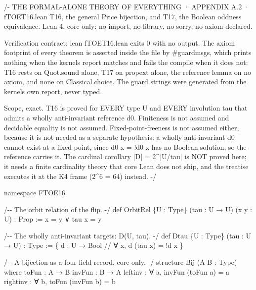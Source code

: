 \documentclass[10pt]{article}
\renewcommand{\_}{\origunderscore\allowbreak}
\newenvironment{Shaded}{}{}
\newcommand{\NormalTok}[1]{#1}
\begin{document}
\begin{Shaded}
\begin{Highlighting}[]
\NormalTok{/{-}}
\NormalTok{THE FORMAL{-}ALONE THEORY OF EVERYTHING · APPENDIX A.2 · fTOE\_T16.lean}
\NormalTok{T16, the general Price bijection, and T17, the Boolean oddness equivalence.}
\NormalTok{Lean 4, core only: no import, no library, no sorry, no axiom declared.}

\NormalTok{Verification contract: \textasciigrave{}lean fTOE\_T16.lean\textasciigrave{} exits 0 with no output. The}
\NormalTok{axiom footprint of every theorem is asserted inside the file by}
\NormalTok{\textasciigrave{}\#guard\_msgs\textasciigrave{}, which prints nothing when the kernel\textquotesingle{}s report matches and}
\NormalTok{fails the compile when it does not: T16 rests on Quot.sound alone, T17 on}
\NormalTok{propext alone, the reference lemma on no axiom, and none on}
\NormalTok{Classical.choice. The guard strings were generated from the kernel\textquotesingle{}s own}
\NormalTok{report, never typed.}

\NormalTok{Scope, exact. T16 is proved for EVERY type U and EVERY involution tau that}
\NormalTok{admits a wholly anti{-}invariant reference d0. Finiteness is not assumed and}
\NormalTok{decidable equality is not assumed. Fixed{-}point{-}freeness is not assumed}
\NormalTok{either, because it is not needed as a separate hypothesis: a wholly}
\NormalTok{anti{-}invariant d0 cannot exist at a fixed point, since d0 x = !d0 x has no}
\NormalTok{Boolean solution, so the reference carries it. The cardinal corollary}
\NormalTok{|D| = 2\^{}|U/tau| is NOT proved here; it needs a finite cardinality theory}
\NormalTok{that core Lean does not ship, and the treatise executes it at the K4 frame}
\NormalTok{(2\^{}6 = 64) instead.}
\NormalTok{{-}/}

\NormalTok{namespace FTOE16}

\NormalTok{/{-}{-} The orbit relation of the flip. {-}/}
\NormalTok{def OrbitRel \{U : Type\} (tau : U → U) (x y : U) : Prop := x = y ∨ tau x = y}

\NormalTok{/{-}{-} The wholly anti{-}invariant targets: D(U, tau). {-}/}
\NormalTok{def Dtau \{U : Type\} (tau : U → U) : Type := \{ d : U → Bool // ∀ x, d (tau x) = !d x \}}

\NormalTok{/{-}{-} A bijection as a four{-}field record, core only. {-}/}
\NormalTok{structure Bij (A B : Type) where}
\NormalTok{  toFun : A → B}
\NormalTok{  invFun : B → A}
\NormalTok{  left\_inv : ∀ a, invFun (toFun a) = a}
\NormalTok{  right\_inv : ∀ b, toFun (invFun b) = b}


\end{Highlighting}
\end{Shaded}
\end{document}
